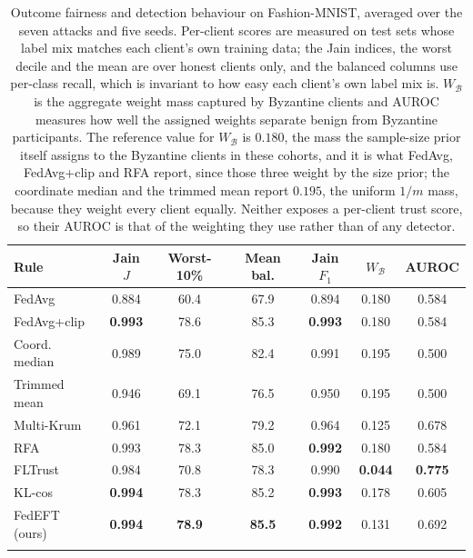 \begin{table}[t]
\centering
\caption{Outcome fairness and detection behaviour on Fashion-MNIST, averaged over the seven attacks and five seeds. Per-client scores are measured on test sets whose label mix matches each client's own training data; the Jain indices, the worst decile and the mean are over honest clients only, and the balanced columns use per-class recall, which is invariant to how easy each client's own label mix is. $W_{\mathcal{B}}$ is the aggregate weight mass captured by Byzantine clients and AUROC measures how well the assigned weights separate benign from Byzantine participants. The reference value for $W_{\mathcal{B}}$ is $0.180$, the mass the sample-size prior itself assigns to the Byzantine clients in these cohorts, and it is what FedAvg, FedAvg+clip and RFA report, since those three weight by the size prior; the coordinate median and the trimmed mean report $0.195$, the uniform $1/m$ mass, because they weight every client equally. Neither exposes a per-client trust score, so their AUROC is that of the weighting they use rather than of any detector.}
\label{tab:fairness}
\setlength{\tabcolsep}{4.5pt}
\footnotesize
\begin{tabular}{@{}lcccccc@{}}
\toprule
Rule & Jain $J$ & Worst-10\% & Mean bal. & Jain $F_1$ & $W_{\mathcal{B}}$ & AUROC\\
\midrule
FedAvg & 0.884 & 60.4 & 67.9 & 0.894 & 0.180 & 0.584\\
FedAvg+clip & \textbf{0.993} & 78.6 & 85.3 & \textbf{0.993} & 0.180 & 0.584\\
Coord. median & 0.989 & 75.0 & 82.4 & 0.991 & 0.195 & 0.500\\
Trimmed mean & 0.946 & 69.1 & 76.5 & 0.950 & 0.195 & 0.500\\
Multi-Krum & 0.961 & 72.1 & 79.2 & 0.964 & 0.125 & 0.678\\
RFA & 0.993 & 78.3 & 85.0 & \textbf{0.992} & 0.180 & 0.584\\
FLTrust & 0.984 & 70.8 & 78.3 & 0.990 & \textbf{0.044} & \textbf{0.775}\\
KL-cos & \textbf{0.994} & 78.3 & 85.2 & \textbf{0.993} & 0.178 & 0.605\\
\midrule
FedEFT (ours) & \textbf{0.994} & \textbf{78.9} & \textbf{85.5} & \textbf{0.992} & 0.131 & 0.692\\
\botrule
\end{tabular}
\end{table}
